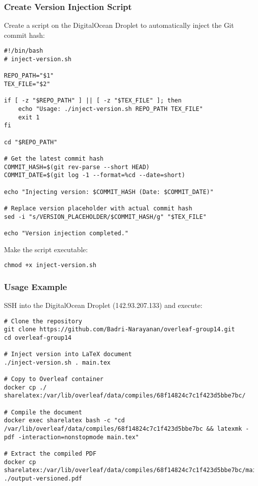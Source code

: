 \subsubsection{Create Version Injection Script}

Create a script on the DigitalOcean Droplet to automatically inject the Git commit hash:

\begin{verbatim}
#!/bin/bash
# inject-version.sh

REPO_PATH="$1"
TEX_FILE="$2"

if [ -z "$REPO_PATH" ] || [ -z "$TEX_FILE" ]; then
    echo "Usage: ./inject-version.sh REPO_PATH TEX_FILE"
    exit 1
fi

cd "$REPO_PATH"

# Get the latest commit hash
COMMIT_HASH=$(git rev-parse --short HEAD)
COMMIT_DATE=$(git log -1 --format=%cd --date=short)

echo "Injecting version: $COMMIT_HASH (Date: $COMMIT_DATE)"

# Replace version placeholder with actual commit hash
sed -i "s/VERSION_PLACEHOLDER/$COMMIT_HASH/g" "$TEX_FILE"

echo "Version injection completed."
\end{verbatim}

Make the script executable:

\begin{verbatim}
chmod +x inject-version.sh
\end{verbatim}

\subsubsection{Usage Example}

SSH into the DigitalOcean Droplet (142.93.207.133) and execute:

\begin{verbatim}
# Clone the repository
git clone https://github.com/Badri-Narayanan/overleaf-group14.git
cd overleaf-group14

# Inject version into LaTeX document
./inject-version.sh . main.tex

# Copy to Overleaf container
docker cp ./ sharelatex:/var/lib/overleaf/data/compiles/68f14824c7c1f423d5bbe7bc/

# Compile the document
docker exec sharelatex bash -c "cd /var/lib/overleaf/data/compiles/68f14824c7c1f423d5bbe7bc && latexmk -pdf -interaction=nonstopmode main.tex"

# Extract the compiled PDF
docker cp sharelatex:/var/lib/overleaf/data/compiles/68f14824c7c1f423d5bbe7bc/main.pdf ./output-versioned.pdf
\end{verbatim}

